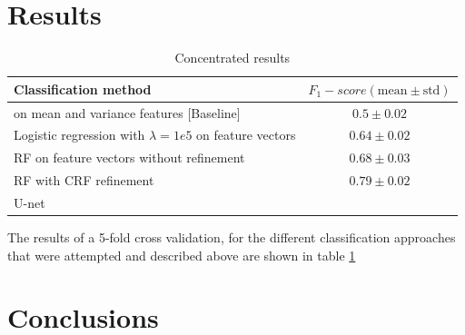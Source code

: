 \documentclass[10pt,conference,compsocconf]{IEEEtran}
\begin{document}
	\section{Results}
		\begin{table}
		\begin{tabular}{p{} c}		
			\textbf{Classification method} &  \textbf{$F_1-score (\text{mean}\pm \text{std})$}\\
			\hline \hline
			 on mean and variance features [Baseline] & $0.5 \pm 0.02$ \\ \hline
			Logistic regression with $\lambda = 1e5$ on feature vectors & $0.64 \pm 0.02$ \\ \hline
			RF on feature vectors without refinement & $0.68 \pm 0.03$ \\ \hline
			RF with CRF refinement & $0.79 \pm 0.02$ \\ \hline
			U-net & $ $ \\
			\hline
		\end{tabular}
		\caption{\label{table:results}Concentrated results}
		\end{table}
	The results of a 5-fold cross validation, for the different classification
  approaches that were attempted and described above are shown in table \ref{table:results}
	\section{Conclusions}
	
	
	
	\printbibliography
\end{document}
